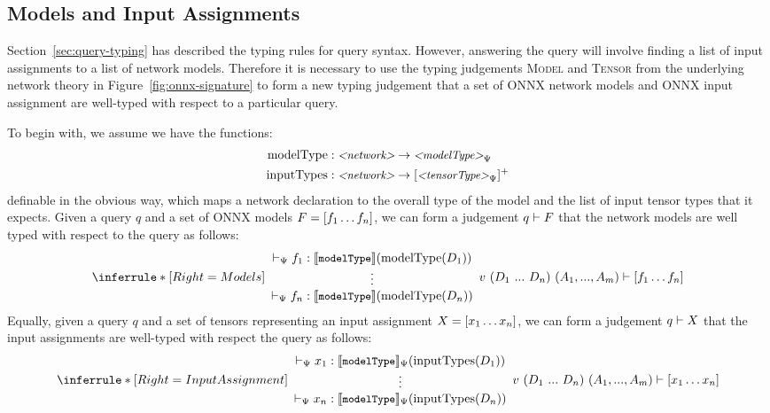 \subsection{Models and Input Assignments}
\label{sec:network-input-assignment-typing}

Section~\ref{sec:query-typing} has described the typing rules for \vnnlib{} query syntax.
However, answering the query will involve finding a list of input assignments to a list of network models.
Therefore it is necessary to use the typing judgements \textsc{Model} and \textsc{Tensor} from the underlying network theory in Figure~\ref{fig:onnx-signature} to form a new typing judgement that a set of ONNX network models and ONNX input assignment are well-typed with respect to a particular query. 

To begin with, we assume we have the functions:
\begin{align*}
\text{modelType} &: \text{\small \textit{<network>}} \rightarrow \text{\small \textit{<modelType>}}_\Psi \\
\text{inputTypes} &: \text{\small \textit{<network>}} \rightarrow [\text{\small \textit{<tensorType>}}_\Psi]^+
\end{align*}
definable in the obvious way, which maps a network declaration to the overall type of the model and the list of input tensor types that it expects.
Given a query $q$ and a set of ONNX models $F = [f_1 \ldots f_n]$, we can form a judgement $q \vdash F$ that the network models are well typed with respect to the query as follows:
\begin{equation*}
\inferrule*[Right=Models]
{
	{\begin{array}{c}
    	\vdash_\networkTheoryVar \networkImplementation_1 : \semModelType(\networkDeclType(\networkDeclVar_1)) \\ 
 	   \vdots \\ 
    	\vdash_\networkTheoryVar \networkImplementation_n : \semModelType(\networkDeclType(\networkDeclVar_n))
	\end{array}}
}
{
    \queryExpansion \vdash \networkImplementations
}
\end{equation*}
Equally, given a query $q$ and a set of tensors representing an input assignment $X = [x_1 \ldots x_n]$, we can form a judgement $q \vdash X$ that the input assignments are well-typed with respect the query as follows:
\begin{equation*}
\inferrule*[Right=InputAssignment]
{
	{\begin{array}{c}
	    \vdash_\networkTheoryVar \networkInput_1 : \semModelType_\networkTheoryVar(\networkInputsType(\networkDeclVar_1)) \\ 
    	\vdots \\ 
    	\vdash_\networkTheoryVar \networkInput_n : \semModelType_\networkTheoryVar(\networkInputsType(\networkDeclVar_n))
    \end{array}}
}
{
    \queryExpansion \vdash \networkInputs
}
\end{equation*}

